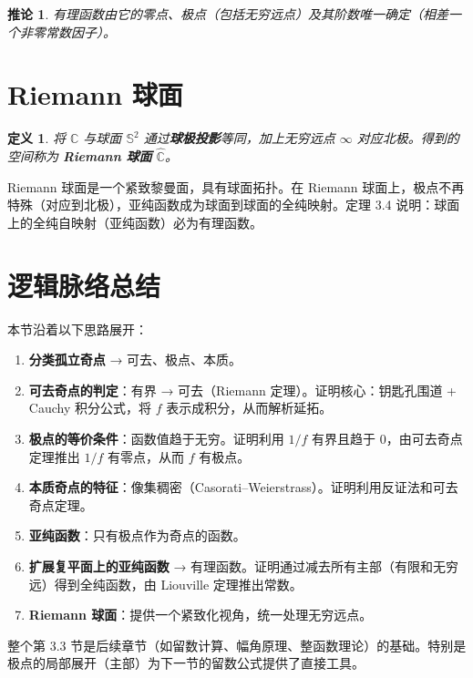 \documentclass[UTF8]{ctexart}
\newtheorem{definition}[theorem]{定义}
\newtheorem{corollary}[theorem]{推论}
\numberwithin{equation}{section}
\newcommand{\CC}{\mathbb{C}}
\begin{document}
\begin{corollary}
有理函数由它的零点、极点（包括无穷远点）及其阶数唯一确定（相差一个非零常数因子）。
\end{corollary}

\section{Riemann 球面}
\begin{definition}
将 \(\CC\) 与球面 \(\mathbb{S}^2\) 通过\textbf{球极投影}等同，加上无穷远点 \(\infty\) 对应北极。得到的空间称为 \textbf{Riemann 球面} \(\widehat{\CC}\)。
\end{definition}

Riemann 球面是一个紧致黎曼面，具有球面拓扑。在 Riemann 球面上，极点不再特殊（对应到北极），亚纯函数成为球面到球面的全纯映射。定理 3.4 说明：球面上的全纯自映射（亚纯函数）必为有理函数。

\section{逻辑脉络总结}
本节沿着以下思路展开：
\begin{enumerate}
\item \textbf{分类孤立奇点} → 可去、极点、本质。
\item \textbf{可去奇点的判定}：有界 → 可去（Riemann 定理）。证明核心：钥匙孔围道 + Cauchy 积分公式，将 \(f\) 表示成积分，从而解析延拓。
\item \textbf{极点的等价条件}：函数值趋于无穷。证明利用 \(1/f\) 有界且趋于 0，由可去奇点定理推出 \(1/f\) 有零点，从而 \(f\) 有极点。
\item \textbf{本质奇点的特征}：像集稠密（Casorati–Weierstrass）。证明利用反证法和可去奇点定理。
\item \textbf{亚纯函数}：只有极点作为奇点的函数。
\item \textbf{扩展复平面上的亚纯函数} → 有理函数。证明通过减去所有主部（有限和无穷远）得到全纯函数，由 Liouville 定理推出常数。
\item \textbf{Riemann 球面}：提供一个紧致化视角，统一处理无穷远点。
\end{enumerate}

整个第 3.3 节是后续章节（如留数计算、幅角原理、整函数理论）的基础。特别是极点的局部展开（主部）为下一节的留数公式提供了直接工具。
\end{document}

